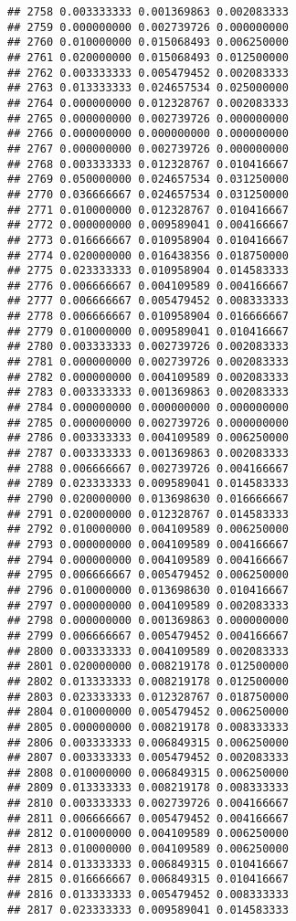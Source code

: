 \documentclass[
]{article}
\begin{document}
\begin{verbatim}
## 2758 0.003333333 0.001369863 0.002083333
## 2759 0.000000000 0.002739726 0.000000000
## 2760 0.010000000 0.015068493 0.006250000
## 2761 0.020000000 0.015068493 0.012500000
## 2762 0.003333333 0.005479452 0.002083333
## 2763 0.013333333 0.024657534 0.025000000
## 2764 0.000000000 0.012328767 0.002083333
## 2765 0.000000000 0.002739726 0.000000000
## 2766 0.000000000 0.000000000 0.000000000
## 2767 0.000000000 0.002739726 0.000000000
## 2768 0.003333333 0.012328767 0.010416667
## 2769 0.050000000 0.024657534 0.031250000
## 2770 0.036666667 0.024657534 0.031250000
## 2771 0.010000000 0.012328767 0.010416667
## 2772 0.000000000 0.009589041 0.004166667
## 2773 0.016666667 0.010958904 0.010416667
## 2774 0.020000000 0.016438356 0.018750000
## 2775 0.023333333 0.010958904 0.014583333
## 2776 0.006666667 0.004109589 0.004166667
## 2777 0.006666667 0.005479452 0.008333333
## 2778 0.006666667 0.010958904 0.016666667
## 2779 0.010000000 0.009589041 0.010416667
## 2780 0.003333333 0.002739726 0.002083333
## 2781 0.000000000 0.002739726 0.002083333
## 2782 0.000000000 0.004109589 0.002083333
## 2783 0.003333333 0.001369863 0.002083333
## 2784 0.000000000 0.000000000 0.000000000
## 2785 0.000000000 0.002739726 0.000000000
## 2786 0.003333333 0.004109589 0.006250000
## 2787 0.003333333 0.001369863 0.002083333
## 2788 0.006666667 0.002739726 0.004166667
## 2789 0.023333333 0.009589041 0.014583333
## 2790 0.020000000 0.013698630 0.016666667
## 2791 0.020000000 0.012328767 0.014583333
## 2792 0.010000000 0.004109589 0.006250000
## 2793 0.000000000 0.004109589 0.004166667
## 2794 0.000000000 0.004109589 0.004166667
## 2795 0.006666667 0.005479452 0.006250000
## 2796 0.010000000 0.013698630 0.010416667
## 2797 0.000000000 0.004109589 0.002083333
## 2798 0.000000000 0.001369863 0.000000000
## 2799 0.006666667 0.005479452 0.004166667
## 2800 0.003333333 0.004109589 0.002083333
## 2801 0.020000000 0.008219178 0.012500000
## 2802 0.013333333 0.008219178 0.012500000
## 2803 0.023333333 0.012328767 0.018750000
## 2804 0.010000000 0.005479452 0.006250000
## 2805 0.000000000 0.008219178 0.008333333
## 2806 0.003333333 0.006849315 0.006250000
## 2807 0.003333333 0.005479452 0.002083333
## 2808 0.010000000 0.006849315 0.006250000
## 2809 0.013333333 0.008219178 0.008333333
## 2810 0.003333333 0.002739726 0.004166667
## 2811 0.006666667 0.005479452 0.004166667
## 2812 0.010000000 0.004109589 0.006250000
## 2813 0.010000000 0.004109589 0.006250000
## 2814 0.013333333 0.006849315 0.010416667
## 2815 0.016666667 0.006849315 0.010416667
## 2816 0.013333333 0.005479452 0.008333333
## 2817 0.023333333 0.009589041 0.014583333

\end{verbatim}
\end{document}
